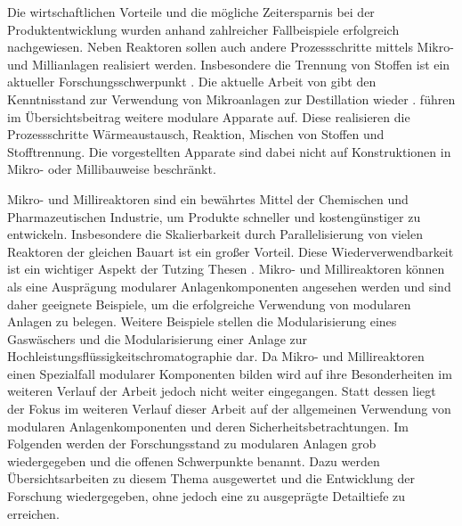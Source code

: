 Die wirtschaftlichen Vorteile und die m\"ogliche Zeitersparnis bei der Produktentwicklung wurden anhand zahlreicher Fallbeispiele erfolgreich nachgewiesen. \cite{Brodhagen_2012, Behr_2012, Grundemann_2012, Sell_2013} Neben Reaktoren sollen auch andere Prozessschritte mittels Mikro- und Millianlagen realisiert werden. Insbesondere die Trennung von Stoffen ist ein aktueller Forschungsschwerpunkt \cite{Helling_2012}. Die aktuelle Arbeit von \citeauthor{Yang_2017} gibt den Kenntnisstand zur Verwendung von Mikroanlagen zur Destillation wieder \cite{Yang_2017}. \citeauthor{Lier_2016} f\"uhren im \"Ubersichtsbeitrag weitere modulare Apparate auf. Diese realisieren die Prozessschritte W\"armeaustausch, Reaktion, Mischen von Stoffen und Stofftrennung. Die vorgestellten Apparate  sind dabei nicht auf Konstruktionen in Mikro- oder Millibauweise beschr\"ankt. \cite{Lier_2016}

Mikro- und Millireaktoren sind ein bew\"ahrtes Mittel der Chemischen und Pharmazeutischen Industrie, um Produkte schneller und kosteng\"unstiger zu entwickeln. Insbesondere die Skalierbarkeit durch Parallelisierung von vielen Reaktoren der gleichen Bauart ist ein gro\ss{}er Vorteil. Diese Wiederverwendbarkeit ist ein wichtiger Aspekt der Tutzing Thesen \cite{Processnet_2009}. Mikro- und Millireaktoren k\"onnen als eine Auspr\"agung modularer Anlagenkomponenten angesehen werden und sind daher geeignete Beispiele, um die erfolgreiche Verwendung von modularen Anlagen zu belegen. Weitere Beispiele stellen die Modularisierung eines  Gasw\"aschers \cite{Ohle_2014} und die Modularisierung einer Anlage zur Hochleistungsfl\"ussigkeitschromatographie \cite{Rottke_2012} dar. \newline
Da Mikro- und Millireaktoren einen Spezialfall modularer Komponenten bilden wird auf ihre Besonderheiten im weiteren Verlauf der Arbeit jedoch nicht weiter eingegangen. Statt dessen liegt der Fokus im weiteren Verlauf dieser Arbeit auf der allgemeinen Verwendung von modularen Anlagenkomponenten und deren Sicherheitsbetrachtungen. \newline
Im Folgenden werden der Forschungsstand zu modularen Anlagen grob wiedergegeben und die offenen Schwerpunkte benannt. Dazu werden \"Ubersichtsarbeiten zu diesem Thema ausgewertet und die Entwicklung der Forschung wiedergegeben, ohne jedoch eine zu ausgepr\"agte Detailtiefe zu erreichen.  

